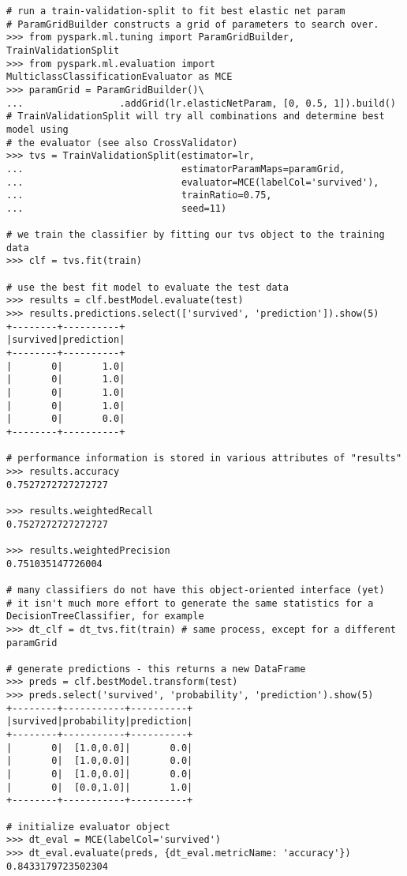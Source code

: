 \begin{lstlisting}
# run a train-validation-split to fit best elastic net param
# ParamGridBuilder constructs a grid of parameters to search over.
>>> from pyspark.ml.tuning import ParamGridBuilder, TrainValidationSplit
>>> from pyspark.ml.evaluation import MulticlassClassificationEvaluator as MCE
>>> paramGrid = ParamGridBuilder()\
...                 .addGrid(lr.elasticNetParam, [0, 0.5, 1]).build()
# TrainValidationSplit will try all combinations and determine best model using
# the evaluator (see also CrossValidator)
>>> tvs = TrainValidationSplit(estimator=lr,
...                            estimatorParamMaps=paramGrid,
...                            evaluator=MCE(labelCol='survived'),
...                            trainRatio=0.75,
...                            seed=11)

# we train the classifier by fitting our tvs object to the training data
>>> clf = tvs.fit(train)

# use the best fit model to evaluate the test data
>>> results = clf.bestModel.evaluate(test)
>>> results.predictions.select(['survived', 'prediction']).show(5)
+--------+----------+
|survived|prediction|
+--------+----------+
|       0|       1.0|
|       0|       1.0|
|       0|       1.0|
|       0|       1.0|
|       0|       0.0|
+--------+----------+

# performance information is stored in various attributes of "results"
>>> results.accuracy
0.7527272727272727

>>> results.weightedRecall
0.7527272727272727

>>> results.weightedPrecision
0.751035147726004

# many classifiers do not have this object-oriented interface (yet)
# it isn't much more effort to generate the same statistics for a DecisionTreeClassifier, for example
>>> dt_clf = dt_tvs.fit(train) # same process, except for a different paramGrid

# generate predictions - this returns a new DataFrame
>>> preds = clf.bestModel.transform(test)
>>> preds.select('survived', 'probability', 'prediction').show(5)
+--------+-----------+----------+
|survived|probability|prediction|
+--------+-----------+----------+
|       0|  [1.0,0.0]|       0.0|
|       0|  [1.0,0.0]|       0.0|
|       0|  [1.0,0.0]|       0.0|
|       0|  [0.0,1.0]|       1.0|
+--------+-----------+----------+

# initialize evaluator object
>>> dt_eval = MCE(labelCol='survived')
>>> dt_eval.evaluate(preds, {dt_eval.metricName: 'accuracy'})
0.8433179723502304
\end{lstlisting}

